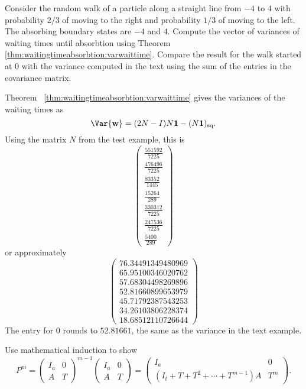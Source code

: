 \documentclass[12pt]{article}
\begin{document}
\begin{exercise}
    Consider the random walk of a particle along a straight line from \(
    -4 \) to \( 4 \) with probability \( 2/3 \) of moving to the right
    and probability \( 1/3 \) of moving to the left.  The absorbing
    boundary states are \( -4 \) and \( 4 \).  Compute the vector of
    variances of waiting times until absorbtion using Theorem~%
    \ref{thm:waitingtimeabsorbtion:varwaittime}.  Compare the result
    for the walk started at \( 0 \) with the variance computed in the
    text using the sum of the entries in the covariance matrix.
\end{exercise}
\begin{solution}
    Theorem~%
    \ref{thm:waitingtimeabsorbtion:varwaittime} gives the variances of
    the waiting times as
    \[
        \Var{\mathbf{w}} = (2N - I)N\mathbf{1} - (N\mathbf{1})_{\text{sq}}.
    \] Using the matrix \( N \) from the test example, this is
    \[
        \begin{pmatrix}
            \frac{551592}{7225}\\
            \frac{476496}{7225}\\
            \frac{83352}{1445}\\
            \frac{15264}{289}\\
            \frac{330312}{7225}\\
            \frac{247536}{7225}\\
            \frac{5400}{289}
        \end{pmatrix}
    \] or approximately
    \[
        \begin{pmatrix}
            76.34491349480969\\
            65.95100346020762\\
            57.68304498269896\\
            52.81660899653979\\
            45.71792387543253\\
            34.26103806228374\\
            18.68512110726644
        \end{pmatrix}
    \] The entry for \( 0 \) rounds to \( 52.81661 \), the same as the variance
    in the text example.
\end{solution}

\begin{exercise}
    Use mathematical induction to show
    \[
        P^{m} =
        \begin{pmatrix}
            I_a & 0 \\
            A & T
        \end{pmatrix}
        ^{m-1}
        \begin{pmatrix}
            I_a & 0 \\
            A & T
        \end{pmatrix}
        =
        \begin{pmatrix}
            I_a & 0 \\
            (I_t + T + T^2 + \cdots + T^{m-1})A & T^m
        \end{pmatrix}
        .
    \]
\end{exercise}
\end{document}
